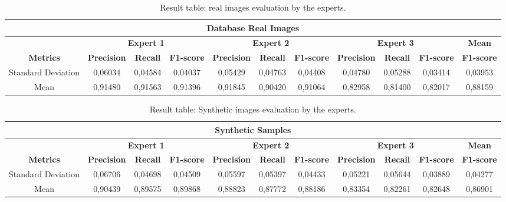\documentclass{ieeeaccess}
\begin{document}
\begin{table}[h!]
\centering
\caption{Result table: real images evaluation by the experts.}
\label{tab:real_images_evaluation}
\begin{tabular}{|c|c|c|c|c|c|c|c|c|c|c|}
\hline
\multicolumn{11}{|c|}{\textbf{Database Real Images}} \\
\hline
~ & \multicolumn{3}{c|}{\textbf{Expert 1}} & \multicolumn{3}{c|}{\textbf{Expert 2}} & \multicolumn{3}{c|}{\textbf{Expert 3}} & \textbf{Mean} \\
\cline{2-11}
\textbf{Metrics} & \textbf{Precision} & \textbf{Recall} & \textbf{F1-score} & \textbf{Precision} & \textbf{Recall} & \textbf{F1-score} & \textbf{Precision} & \textbf{Recall} & \textbf{F1-score} & \textbf{F1-score} \\
\hline
Standard Deviation & 0,06034 & 0,04584 & 0,04037 & 0,05429 & 0,04763 & 0,04408 & 0,04780 & 0,05288 & 0,03414 & 0,03953 \\
\hline
Mean & 0,91480 & 0,91563 & 0,91396 & 0,91845 & 0,90420 & 0,91064 & 0,82958 & 0,81400 & 0,82017 & 0,88159 \\
\hline
\end{tabular}
\end{table}

\begin{table}[h!]
\centering
\caption{Result table: Synthetic images evaluation by the experts.}
\label{tab:synthetic_images_evaluation}
\begin{tabular}{|c|c|c|c|c|c|c|c|c|c|c|}
\hline
\multicolumn{11}{|c|}{\textbf{Synthetic Samples}} \\
\hline
~ & \multicolumn{3}{c|}{\textbf{Expert 1}} & \multicolumn{3}{c|}{\textbf{Expert 2}} & \multicolumn{3}{c|}{\textbf{Expert 3}} & \textbf{Mean} \\
\cline{2-11}
\textbf{Metrics} & \textbf{Precision} & \textbf{Recall} & \textbf{F1-score} & \textbf{Precision} & \textbf{Recall} & \textbf{F1-score} & \textbf{Precision} & \textbf{Recall} & \textbf{F1-score} & \textbf{F1-score} \\
\hline
Standard Deviation & 0,06706 & 0,04698 & 0,04509 & 0,05597 & 0,05397 & 0,04433 & 0,05221 & 0,05644 & 0,03889 & 0,04277 \\
\hline
Mean & 0,90439 & 0,89575 & 0,89868 & 0,88823 & 0,87772 & 0,88186 & 0,83354 & 0,82261 & 0,82648 & 0,86901 \\
\hline
\end{tabular}
\end{table}
\end{document}
